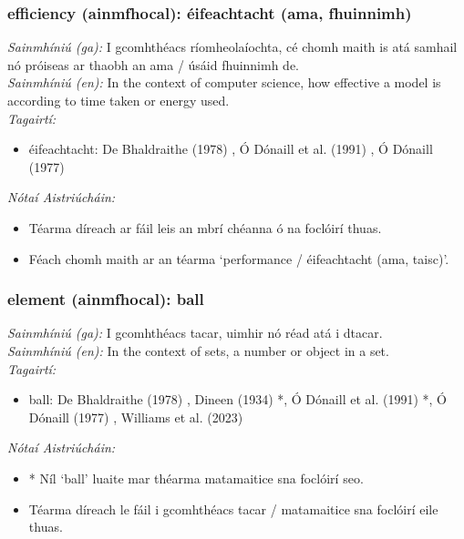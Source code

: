 \subsubsection*{efficiency (ainmfhocal): éifeachtacht (ama, fhuinnimh)}
 \noindent \textit{Sainmhíniú (ga):} I gcomhthéacs ríomheolaíochta, cé chomh maith is atá samhail nó próiseas ar thaobh an ama / úsáid fhuinnimh de.
\\
 \noindent \textit{Sainmhíniú (en):} In the context of computer science, how effective a model is according to time taken or energy used.
\\
 \noindent \textit{Tagairtí:}
\begin{itemize}
	\item éifeachtacht: De Bhaldraithe (1978) \cite{de-bhaldraithe}, Ó Dónaill et al. (1991) \cite{focloir-beag}, Ó Dónaill (1977) \cite{odonaill}
\end{itemize}

 \noindent \textit{Nótaí Aistriúcháin:}
\begin{itemize}
	\item Téarma díreach ar fáil leis an mbrí chéanna ó na foclóirí thuas.
	\item Féach chomh maith ar an téarma `performance / éifeachtacht (ama, taisc)'.
\end{itemize}


\subsubsection*{element (ainmfhocal): ball}
 \noindent \textit{Sainmhíniú (ga):} I gcomhthéacs tacar, uimhir nó réad atá i dtacar.
\\
 \noindent \textit{Sainmhíniú (en):} In the context of sets, a number or object in a set.
\\
 \noindent \textit{Tagairtí:}
\begin{itemize}
	\item ball: De Bhaldraithe (1978) \cite{de-bhaldraithe}, Dineen (1934) \cite{dineen}*, Ó Dónaill et al. (1991) \cite{focloir-beag}*, Ó Dónaill (1977) \cite{odonaill}, Williams et al. (2023) \cite{storchiste}
\end{itemize}

 \noindent \textit{Nótaí Aistriúcháin:}
\begin{itemize}
	\item * Níl `ball' luaite mar théarma matamaitice sna foclóirí seo.
	\item Téarma díreach le fáil i gcomhthéacs tacar / matamaitice sna foclóirí eile thuas.
\end{itemize}


